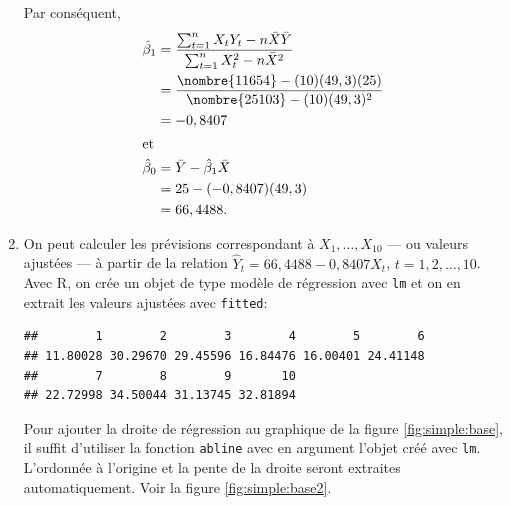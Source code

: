 \begin{solution}{2.1}
\begin{enumerate}
\begin{displaymath}
      \end{displaymath}
      Par conséquent,
      \begin{align*}
        \hat{\beta}_1
        &= \frac{\sum_{t=1}^n X_t Y_t - n \bar{X}\bar{Y}}{\sum_{t=1}^n
          X_t^2 - n \bar{X}^2} \\
        &= \frac{\nombre{11654} - (10)(49,3)(25)}{\nombre{25103} -
          (10)(49,3)^2} \\
        &= -0,8407 \\
        \intertext{et}
        \hat{\beta}_0
        &=\bar{Y}-\hat{\beta}_1\bar{X}\\
        &=25 - (-0,8407)(49,3)\\
        &=66,4488.
      \end{align*}
    \item On peut calculer les prévisions correspondant à $X_1, \dots,
      X_{10}$ --- ou valeurs ajustées --- à partir de la relation
      $\hat{Y}_t = 66,4488 - 0,8407 X_t$, $t = 1, 2, \dots, 10$. Avec
      \textsf{R}, on crée un objet de type modèle de régression avec
      \texttt{lm} et on en extrait les valeurs ajustées avec
      \texttt{fitted}:
\begin{knitrout}
\color{fgcolor}\begin{kframe}
\begin{alltt}
 \hlkwb{<-}  \hlopt{~} 
\end{alltt}
\begin{verbatim}
##        1        2        3        4        5        6
## 11.80028 30.29670 29.45596 16.84476 16.00401 24.41148
##        7        8        9       10
## 22.72998 34.50044 31.13745 32.81894
\end{verbatim}
\end{kframe}
\end{knitrout}
      Pour ajouter la droite de régression au graphique de la figure
      \ref{fig:simple:base}, il suffit d'utiliser la fonction
      \texttt{abline} avec en argument l'objet créé avec
      \texttt{lm}. L'ordonnée à l'origine et la pente de la droite
      seront extraites automatiquement. Voir la figure \ref{fig:simple:base2}.
      \begin{figure}
        \centering
\begin{knitrout}
\color{fgcolor}\begin{kframe}
\begin{alltt}
\end{alltt}
\end{kframe}
\end{knitrout}
\begin{knitrout}
\color{fgcolor}


\end{knitrout}
\end{figure}
\end{enumerate}
\end{solution}
